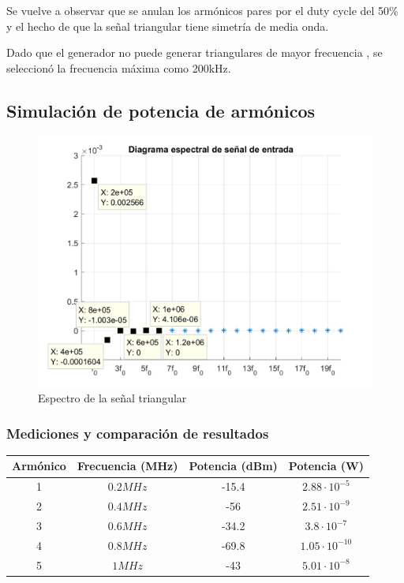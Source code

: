 \documentclass[../../labo_tp5_main.tex]{subfiles}
\begin{document}
Se vuelve a observar que se anulan los armónicos pares por el duty cycle del 50\% y el hecho de que la señal triangular tiene simetría de media onda.\par
Dado que el generador no puede generar triangulares de mayor frecuencia , se seleccionó la frecuencia máxima como 200kHz.\par

\subsection{Simulación de potencia de armónicos}
\begin{figure}[H]	
	\centering
	\includegraphics[scale=0.4]{imagenes/espectro_triangular_potencia.png}
	\caption{Espectro de la señal triangular}
	\label{fig:ej1_espectro_triangular_potencia}
\end{figure}

\subsubsection{Mediciones y comparación de resultados}
\begin{table}[H] %
	\centering
 		\begin{tabular}{||c c c c||} 
 			\hline
			Armónico & Frecuencia (MHz) & Potencia (dBm) & Potencia (W)\\ [0.5ex] 
 			\hline\hline
			1 & $0.2MHz$ & -15.4 & $2.88\cdot 10^{-5}$\\
			2 & $0.4MHz$ & -56 & $2.51\cdot 10^{-9}$\\
			3 & $0.6MHz$ & -34.2 & $3.8\cdot 10^{-7}$\\
			4 & $0.8MHz$ & -69.8 & $1.05\cdot 10^{-10}$\\
			5 & $1MHz$ & -43 & $5.01\cdot 10^{-8}$\\[1ex] 
			\hline
		\end{tabular}
\end{table}
\end{document}
